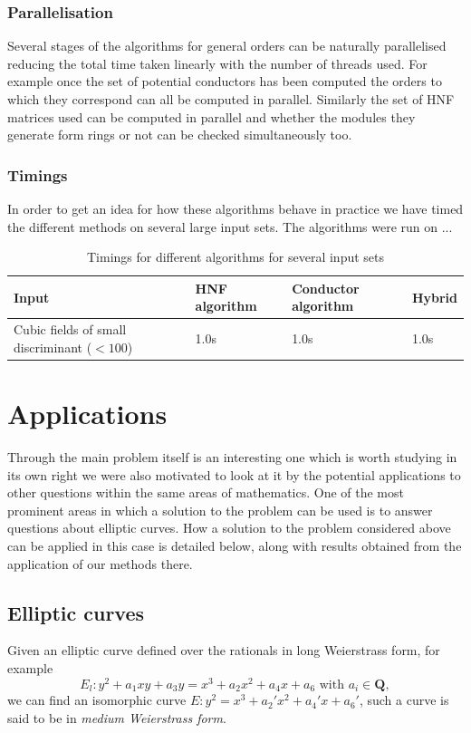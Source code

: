 \documentclass[12pt,a4paper,abstracton,bibtotoc]{scrreprt}
\theoremstyle{definition}
\newcommand{\QQ}{\mathbf{Q}}
\begin{document}
\subsection{Parallelisation}
Several stages of the algorithms for general orders can be naturally parallelised reducing the total time taken linearly with the number of threads used.
For example once the set of potential conductors has been computed the orders to which they correspond can all be computed in parallel.
Similarly the set of HNF matrices used can be computed in parallel and whether the modules they generate form rings or not can be checked simultaneously too.

\subsection{Timings}
In order to get an idea for how these algorithms behave in practice we have timed the different methods on several large input sets.
The algorithms were run on ...
\begin{table}[h]
\begin{tabular}{|p{14em}|l|l|l|}
\hline
Input & HNF algorithm & Conductor algorithm & Hybrid \\
\hline
Cubic fields of small discriminant ($< 100$) & 1.0s & 1.0s & 1.0s \\
\hline
\end{tabular}
\caption{\label{tab:timings} Timings for different algorithms for several input sets}
\end{table}


\chapter{Applications}

Through the main problem itself is an interesting one which is worth studying in its own right we were also motivated to look at it by the potential applications to other questions within the same areas of mathematics.
One of the most prominent areas in which a solution to the problem can be used is to answer questions about elliptic curves.
How a solution to the problem considered above can be applied in this case is detailed below, along with results obtained from the application of our methods there.

\section{Elliptic curves}
\label{sec:ellapp}
Given an elliptic curve defined over the rationals in long Weierstrass form, for example
\[E_l \colon y^2 + a_1xy + a_3y = x^3 + a_2x^2 + a_4x + a_6\text{ with }a_i \in \QQ,\]
we can find an isomorphic curve $E \colon y^2 = x^3 + a_2'x^2 + a_4'x + a_6'$, such a curve is said to be in \emph{medium Weierstrass form}.
\end{document}
